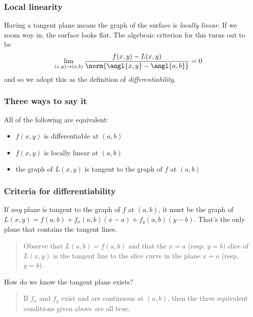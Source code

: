 \documentclass[11pt,ignorenonframetext,aspectratio=169,xcolor={svgnames}]{beamer}
\begin{document}
\begin{frame}\frametitle{Local linearity}

Having a tangent plane means the graph of the surface is \emph{locally
linear}. If we zoom way in, the surface looks flat. The algebraic
criterion for this turns out to be
\[ \lim_{(x, y) \to (a, b)} \frac{f(x, y) - L(x,y)}{\norm{\angl{x,y} - \angl{a,b}}} = 0\]
and so we adopt this as the definition of \emph{differentiability}.

\end{frame}

\begin{frame}\frametitle{Three ways to say it}

All of the following are equivalent:

\begin{itemize}[<+->]

\item
  $f(x,y)$ is differentiable at $(a,b)$
\item
  $f(x,y)$ is locally linear at $(a,b)$
\item
  the graph of $L(x,y)$ is tangent to the graph of $f$ at $(a,b)$
\end{itemize}

\end{frame}

\begin{frame}\frametitle{Criteria for differentiability}

If \emph{any} plane is tangent to the graph of $f$ at $(a,b)$, it must
be the graph of $L(x,y) = f(a,b) + f_x(a,b)(x-a) + f_y(a,b)(y - b)$.
That's the only plane that contains the tangent lines.

\begin{quote}
Observe that $L(a, b) = f(a, b)$ and that the $x = a$ (resp. $y = b$)
slice of $L(x,y)$ is the tangent line to the slice curve in the plane
$x = a$ (resp. $y = b$).
\end{quote}

How do we know the tangent plane exists?

\begin{quote}
If $f_x$ and $f_y$ exist and are continuous at $(a,b)$, then the three
equivalent conditions given above are all true.
\end{quote}

\end{frame}
\end{document}
